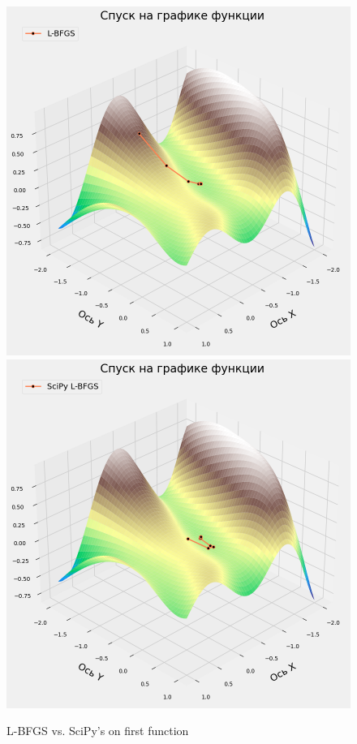\documentclass[12pt, a4paper, oneside, final]{article}
\begin{document}
	\begin{figure}[H]
		\centering
		\includegraphics[scale = 0.35]{Image/T2A_F1_LBFGS.png}
		\includegraphics[scale = 0.35]{Image/T2A_F1_scipy_LBFGS.png}
		\caption*{L-BFGS vs. SciPy's on first function}
	\end{figure}
\end{document}
